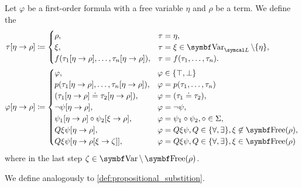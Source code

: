 \begin{definition}\label{def:first_order_substition}
  Let \( \varphi \) be a first-order formula with a free variable \( \eta \) and \( \rho \) be a term. We define the 
  \begin{align*}
    \tau[\eta \to \rho] &\coloneqq \begin{cases}
      \rho,                                                    &\tau = \eta, \\
      \xi,                                                     &\tau = \xi \in \Cat{Var}_{\Cal{L}} \setminus \{ \eta \}, \\
      f(\tau_1[\eta \to \rho], \ldots, \tau_n[\eta \to \rho]), &\tau = f(\tau_1, \ldots, \tau_n).
    \end{cases}
    \\
    \varphi[\eta \to \rho] &\coloneqq \begin{cases}
      \varphi,                                                 &\varphi \in \{ \top, \bot \} \\
      p(\tau_1[\eta \to \rho], \ldots, \tau_n[\eta \to \rho]), &\varphi = p(\tau_1, \ldots, \tau_n) \\
      (\tau_1[\eta \to \rho] \doteq \tau_2[\eta \to \rho]),    &\varphi = (\tau_1 \doteq \tau_2), \\
      \neg \psi[\eta \to \rho],                                &\varphi = \neg \psi, \\
      \psi_1[\eta \to \rho] \circ \psi_2[\xi \to \rho],          &\varphi = \psi_1 \circ \psi_2, \circ \in \Sigma, \\
      Q \xi \psi[\eta \to \rho],                               &\varphi = Q \xi \psi, Q \in \{ \forall, \exists \}, \xi \not\in \Cat{Free}(\rho), \\
      Q \xi \psi[\eta \to \rho[\xi \to \zeta]],                &\varphi = Q \xi \psi, Q \in \{ \forall, \exists \}, \xi \in \Cat{Free}(\rho)
    \end{cases}
  \end{align*}
  where in the last step \( \zeta \in \Cat{Var} \setminus \Bold{Free}(\rho) \).

  We define  analogously to \cref{def:propositional_substition}.
\end{definition}

